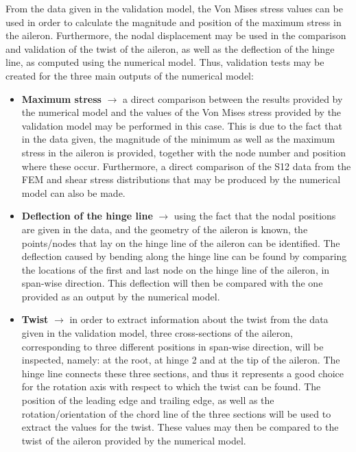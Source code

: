 \noindent From the data given in the validation model, the Von Mises stress values can be used in order to calculate the magnitude and position of the maximum stress in the aileron. Furthermore, the nodal displacement may be used in the comparison and validation of the twist of the aileron, as well as the deflection of the hinge line, as computed using the numerical model. Thus, validation tests may be created for the three main outputs of the numerical model: 
\begin{itemize}
    \item \textbf{Maximum stress} $\rightarrow$ a direct comparison between the results provided by the numerical model and the values of the Von Mises stress provided by the validation model may be performed in this case. This is due to the fact that in the data given, the magnitude of the minimum as well as the maximum stress in the aileron is provided, together with the node number and position where these occur. Furthermore, a direct comparison of the S12 data from the FEM and shear stress distributions that may be produced by the numerical model can also be made. 
    
    \item \textbf{Deflection of the hinge line} $\rightarrow$ using the fact that the nodal positions are given in the data, and the geometry of the aileron is known, the points/nodes that lay on the hinge line of the aileron can be identified. The deflection caused by bending along the hinge line can be found by comparing the locations of the first and last node on the hinge line of the aileron, in span-wise direction. This deflection will then be compared with the one provided as an output by the numerical model.
    
    \item \textbf{Twist} $\rightarrow$ in order to extract information about the twist from the data given in the validation model, three cross-sections of the aileron, corresponding to three different positions in span-wise direction, will be inspected, namely: at the root, at hinge 2 and at the tip of the aileron. The hinge line connects these three sections, and thus it represents a good choice for the rotation axis with respect to which the twist can be found. The position of the leading edge and trailing edge, as well as the rotation/orientation of the chord line of the three sections will be used to extract the values for the twist. These values may then be compared to the twist of the aileron provided by the numerical model.  
    
\end{itemize}

